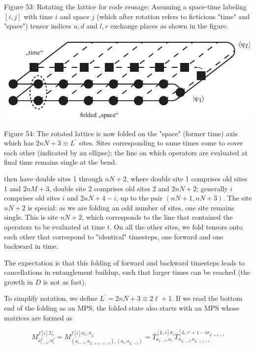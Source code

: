 \documentclass[12pt]{article}
\begin{document}
Figure 53: Rotating the lattice for code reusage: Assuming a space-time labeling $[i, j]$ with time $i$ and space $j$ (which after rotation refers to ficticious "time" and "space") tensor indices $u, d$ and $l, r$ exchange places as shown in the figure.

\begin{center}
\includegraphics[max width=\textwidth]{2024_05_04_afc4ad226da9ccfe0ac8g-092}
\end{center}

Figure 54: The rotated lattice is now folded on the "space" (former time) axis which has $2 n N+3 \equiv L^{\prime}$ sites. Sites corresponding to same times come to cover each other (indicated by an ellipse); the line on which operators are evaluated at final time remains single at the bend.

then have double sites 1 through $n N+2$, where double site 1 comprises old sites 1 and $2 n M+3$, double site 2 comprises old sites 2 and $2 n N+2$; generally $i$ comprises old sites $i$ and $2 n N+4-i$, up to the pair $(n N+1, n N+3)$. The site $n N+2$ is special: as we are folding an odd number of sites, one site remains single. This is site $n N+2$, which corresponds to the line that contained the operators to be evaluated at time $t$. On all the other sites, we fold tensors onto each other that correspond to "identical" timesteps, one forward and one backward in time.

The expectation is that this folding of forward and backward timesteps leads to cancellations in entanglement buildup, such that larger times can be reached (the growth in $D$ is not as fast).

To simplify notation, we define $L^{\prime}=2 n N+3 \equiv 2 \ell+1$. If we read the bottom end of the folding as an MPS, the folded state also starts with an MPS whose matrices are formed as


\begin{equation*}
M_{a_{i-1}^{f}, a_{i}^{f}}^{f[i] \Sigma_{i}}=M_{\left(a_{i-1}, a_{L^{\prime}+1-i-i}\right),\left(a_{i}, a_{L^{\prime}-i}\right)}^{f[i] \sigma_{\sigma}, \sigma_{L^{\prime}}}=\bar{T}_{a_{i-1}, a_{i}}^{[L, i] \sigma_{i}} \bar{T}_{a_{L^{\prime}-i}, a_{L^{\prime}+1-i}}^{\left[L, \tau^{\prime}+1-i \sigma_{L^{\prime}+1-i}\right.} \tag{285}
\end{equation*}
\end{document}
